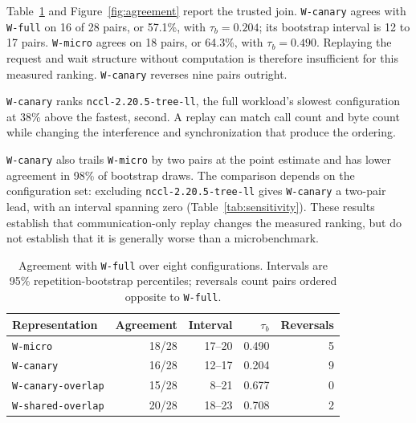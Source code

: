 \documentclass[10pt,twocolumn]{article}
\newcommand{\wname}[1]{\texttt{W-#1}}
\begin{document}
Table~\ref{tab:agreement} and Figure~\ref{fig:agreement} report the trusted
join. \wname{canary} agrees with
\wname{full} on 16 of 28 pairs, or 57.1\%, with $\tau_b=0.204$; its bootstrap
interval is 12 to 17 pairs. \wname{micro} agrees on 18 pairs, or 64.3\%, with
$\tau_b=0.490$. Replaying the request and wait structure without computation is
therefore insufficient for this measured ranking. \wname{canary} reverses nine
pairs outright.

\wname{canary} ranks \texttt{nccl-2.20.5-tree-ll}, the full workload's slowest
configuration at 38\% above the fastest, second. A replay can match call count
and byte count while changing the interference and synchronization that
produce the ordering.

\wname{canary} also trails \wname{micro} by two pairs at the point estimate
and has lower agreement in 98\% of bootstrap draws. The comparison depends on
the configuration set: excluding \texttt{nccl-2.20.5-tree-ll} gives
\wname{canary} a two-pair lead, with an interval spanning zero
(Table~\ref{tab:sensitivity}). These results establish that communication-only
replay changes the measured ranking, but do not establish that it is generally
worse than a microbenchmark.

\begin{table}[t]
\caption{Agreement with \wname{full} over eight configurations. Intervals are
95\% repetition-bootstrap percentiles; reversals count pairs ordered opposite
to \wname{full}.}
\label{tab:agreement}
\centering\footnotesize
\setlength{\tabcolsep}{4pt}
\begin{tabular}{@{}lrrrr@{}}
\toprule
Representation & Agreement & Interval & $\tau_b$ & Reversals \\
\midrule
\wname{micro} & 18/28 & 17--20 & 0.490 & 5 \\
\wname{canary} & 16/28 & 12--17 & 0.204 & 9 \\
\wname{canary-overlap} & 15/28 & 8--21 & 0.677 & 0 \\
\wname{shared-overlap} & 20/28 & 18--23 & 0.708 & 2 \\
\bottomrule
\end{tabular}
\end{table}
\end{document}
